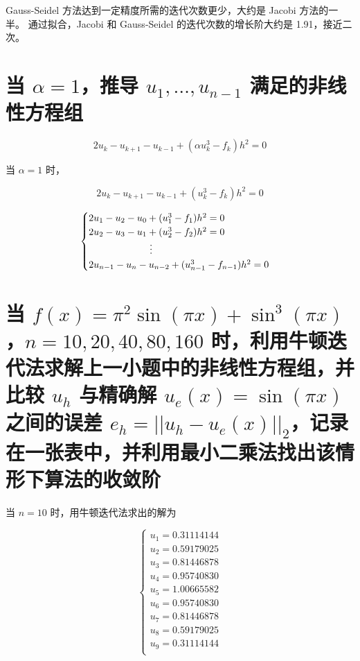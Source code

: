 \documentclass[a4paper,12pt]{ctexart}
\begin{document}
Gauss-Seidel 方法达到一定精度所需的迭代次数更少，大约是 Jacobi 方法的一半。
通过拟合，Jacobi 和 Gauss-Seidel 的迭代次数的增长阶大约是 1.91，接近二次。




\section{当 $\alpha = 1$，推导 $u_1, \ldots, u_{n-1}$ 满足的非线性方程组}


$$
2u_k - u_{k+1} - u_{k-1} +  \left(\alpha u_k^3 - f_k\right) h^2 = 0
$$


当 $\alpha = 1$ 时，

$$
2u_k - u_{k+1} - u_{k-1} + \left(u_k^3 - f_k\right) h^2 = 0
$$

$$
\begin{cases}
    2u_1 - u_2 - u_0 + (u_1^3 - f_1) h^2 = 0 \\
    2u_2 - u_3 - u_1 + (u_2^3 - f_2) h^2 = 0 \\
    \hspace{6.3em} \vdots \\
    2u_{n-1} - u_{n} - u_{n-2} + (u_{n-1}^3 - f_{n-1}) h^2 = 0
\end{cases}
$$


\section{当 $f(x) = \pi^2 \sin(\pi x) + \sin^3(\pi x)$，$n = 10, 20, 40, 80, 160$ 时，利用牛顿迭代法求解上一小题中的非线性方程组，并比较 $u_h$ 与精确解 $u_e(x) = \sin(\pi x)$ 之间的误差 $e_h = ||u_h - u_e(x)||_2$，记录在一张表中，并利用最小二乘法找出该情形下算法的收敛阶}



当 $n = 10$ 时，用牛顿迭代法求出的解为

$$
\begin{cases}
    u_1 = 0.31114144    \\
    u_2 = 0.59179025    \\
    u_3 = 0.81446878    \\
    u_4 = 0.95740830    \\
    u_5 = 1.00665582    \\
    u_6 = 0.95740830    \\
    u_7 = 0.81446878    \\
    u_8 = 0.59179025    \\
    u_9 = 0.31114144    \\
\end{cases}
$$
\end{document}
